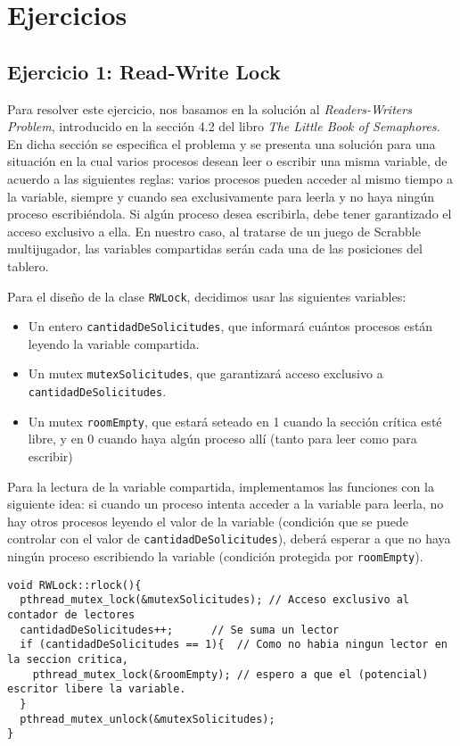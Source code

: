 \section{Ejercicios}

\subsection{Ejercicio 1: Read-Write Lock}
Para resolver este ejercicio, nos basamos en la soluci\'on al \textit{Readers-Writers Problem}, introducido en la secci\'on 4.2 del libro 
\textit{The Little Book of Semaphores}. En dicha secci\'on se especifica el problema y se presenta una soluci\'on para una situaci\'on en la 
cual varios procesos desean leer o escribir una misma variable, de acuerdo a las siguientes reglas: varios procesos pueden acceder al mismo tiempo a la 
variable, siempre y cuando sea exclusivamente para leerla y no haya ning\'un proceso escribi\'endola. Si alg\'un proceso desea escribirla, 
debe tener garantizado el acceso exclusivo a ella. En nuestro caso, al tratarse de un juego de Scrabble multijugador, las variables compartidas ser\'an 
cada una de las posiciones del tablero.

Para el dise\~no de la clase \verb|RWLock|, decidimos usar las siguientes variables:

\begin{itemize}
 \item Un entero \verb|cantidadDeSolicitudes|, que informar\'a cu\'antos procesos est\'an leyendo la variable compartida.
 \item Un mutex \verb|mutexSolicitudes|, que garantizar\'a acceso exclusivo a \verb|cantidadDeSolicitudes|.
 \item Un mutex \verb|roomEmpty|, que estar\'a seteado en 1 cuando la secci\'on cr\'itica est\'e libre, y en 0 cuando haya alg\'un proceso all\'i (tanto
 para leer como para escribir)
\end{itemize}

Para la lectura de la variable compartida, implementamos las funciones con la siguiente idea: si cuando un proceso intenta acceder a la variable para leerla,
no hay otros procesos leyendo el valor de la variable (condici\'on que se puede controlar con el valor de \verb|cantidadDeSolicitudes|), deber\'a esperar
a que no haya ning\'un proceso escribiendo la variable (condici\'on protegida por \verb|roomEmpty|). 

\begin{verbatim}
void RWLock::rlock(){
  pthread_mutex_lock(&mutexSolicitudes); // Acceso exclusivo al contador de lectores
  cantidadDeSolicitudes++;		// Se suma un lector
  if (cantidadDeSolicitudes == 1){	// Como no habia ningun lector en la seccion critica,
    pthread_mutex_lock(&roomEmpty);	// espero a que el (potencial) escritor libere la variable.
  }
  pthread_mutex_unlock(&mutexSolicitudes);
}
\end{verbatim}

